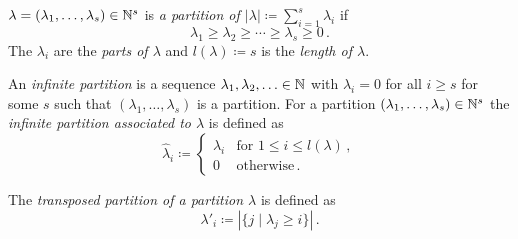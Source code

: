 %   



\begin{definition}
  $\lambda = (\lambda_1, \dotsc, \lambda_s) \in \mathbb{N}^s$ is \emph{a partition of $|\lambda| \coloneqq \sum_{i=1}^s \lambda_i$} if
  \[
          \lambda_1
    \geq  \lambda_2
    \geq  \dotsb
    \geq  \lambda_s
    \geq  0 \,.
  \]
  The $\lambda_i$ are the \emph{parts of $\lambda$} and $l(\lambda) \coloneqq s$ is the \emph{length of $\lambda$}.
  
  An \emph{infinite partition} is a sequence $\lambda_1, \lambda_2, \dotsc \in \mathbb{N}$ with $\lambda_i = 0$ for all $i \geq s$ for some $s$ such that $(\lambda_1, \dotsc, \lambda_s)$ is a partition.
  For a partition $(\lambda_1, \dotsc, \lambda_s) \in \mathbb{N}^s$ the \emph{infinite partition associated to $\lambda$} is defined as
  \[
              \hat{\lambda}_i
    \coloneqq \begin{cases}
                \lambda_i & \text{for } 1 \leq i \leq l(\lambda) \,,  \\
                        0 & \text{otherwise} \,.
              \end{cases}
  \]
  
  The \emph{transposed partition of a partition $\lambda$} is defined as
  \[
              \lambda'_i
    \coloneqq |\{j \mid \lambda_j \geq i\}| \,.
  \]
\end{definition}


